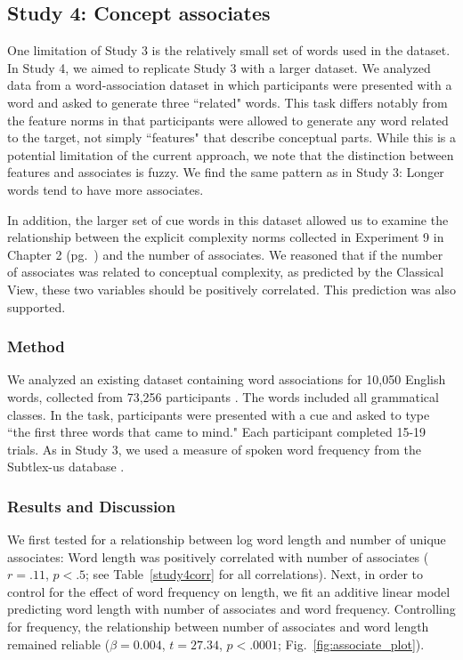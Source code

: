 \subsection{Study 4: Concept associates}
One limitation of Study 3 is the relatively small set of words used in the dataset. In Study 4, we aimed to replicate Study 3 with a larger dataset. We analyzed data from a word-association dataset in which participants were presented with a word and asked to generate three ``related" words. This task differs notably from the feature norms in that participants were allowed to generate any word related to the target, not simply ``features" that describe conceptual parts. While this is a potential limitation of the current approach, we note that the distinction between features and associates is fuzzy. We find  the same pattern as in Study 3: Longer words tend to have more associates. 

In addition, the larger set of cue words in this dataset allowed us to  examine the relationship between the explicit complexity norms collected in  Experiment 9 in Chapter 2 (pg.\ \pageref{ch2-9}) and the number of associates. We reasoned that if the number of associates was related to conceptual complexity, as predicted by the Classical View,  these two variables should be positively correlated. This prediction was also supported.

\subsubsection{Method}
We analyzed an existing dataset containing word associations for  10,050 English words, collected from 73,256 participants \cite{de2013better}. The words included all grammatical classes. In the task, participants were presented with a cue and  asked to type ``the first  three words that came to mind." Each participant completed 15-19 trials. As in Study 3, we used a measure of spoken word frequency from the Subtlex-us database \cite{brysbaert2009moving}. 

\subsubsection{Results and Discussion}
We first tested for a relationship between log word length and number of unique associates: Word length was positively correlated with number of associates ($r = .11$, $p< .5$; see Table~\ref{study4corr} for all correlations).  Next, in order to control for the effect of word frequency on length, we fit an additive linear model predicting word length with number of associates and word frequency. Controlling for frequency, the relationship between number of associates and word length remained reliable ($\beta=0.004$, $t =27.34$, $p<.0001$; Fig.\ \ref{fig:associate_plot}).

